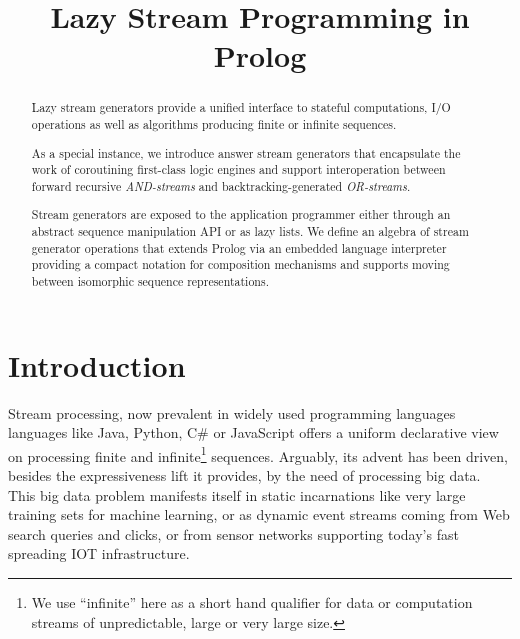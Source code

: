 \documentclass{new_tlp}
\begin{document}

\title{Lazy Stream Programming in Prolog}

\begin{comment}
 \author[Paul Tarau]
         {%
          Paul Tarau\\
          Dept. of Computer Science and Engineering \\ University of North Texas\\
          1155 Union Circle, Denton, Texas 76203, USA}
\end{comment}

\maketitle

\begin{abstract}
Lazy stream generators provide a unified interface to stateful computations, I/O operations as well as algorithms producing finite or infinite sequences. 

As a special instance, we introduce answer stream generators that 
encapsulate the work of coroutining first-class logic engines and support interoperation between forward recursive {\em AND-streams} and backtracking-generated {\em OR-streams}. 

Stream generators are exposed to the application programmer either through an abstract sequence manipulation API or as lazy lists. We define an algebra of stream generator operations that extends Prolog via an embedded language interpreter providing a compact notation for composition mechanisms and supports moving between isomorphic sequence representations.

\end{abstract}

\section{Introduction}

Stream processing, now prevalent in widely used programming languages languages like Java, Python, C\# or JavaScript offers a uniform declarative view on processing finite 
and infinite\footnote{We use ``infinite'' here as a short hand qualifier for data or computation streams of unpredictable, large or very large size.} sequences. Arguably, its advent has been driven, besides the expressiveness lift it provides, by the need of processing big data. This big data problem manifests itself in static incarnations like very large training sets for machine learning, or as dynamic event streams coming from Web search queries and clicks,  or from sensor networks supporting today's fast spreading IOT infrastructure.
 
\end{document}
